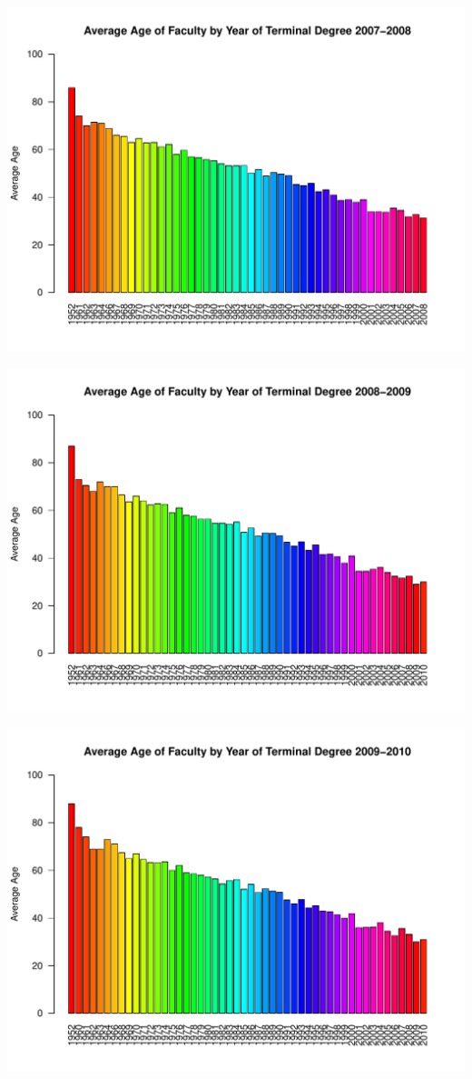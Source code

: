 \documentclass[12pt,a4paper]{article}\usepackage[]{graphicx}\usepackage[]{color}
\makeatletter
\def\maxwidth{ %
  \ifdim\Gin@nat@width>\linewidth
    \linewidth
  \else
    \Gin@nat@width
  \fi
}
\newenvironment{knitrout}{}{} %
\theoremstyle{definition}
\makeatother
\begin{document}
\begin{knitrout}
\includegraphics[width=\maxwidth]{figure/unnamed-chunk-12-4} 

\includegraphics[width=\maxwidth]{figure/unnamed-chunk-12-5} 

\includegraphics[width=\maxwidth]{figure/unnamed-chunk-12-6} 


\end{knitrout}
\end{document}
